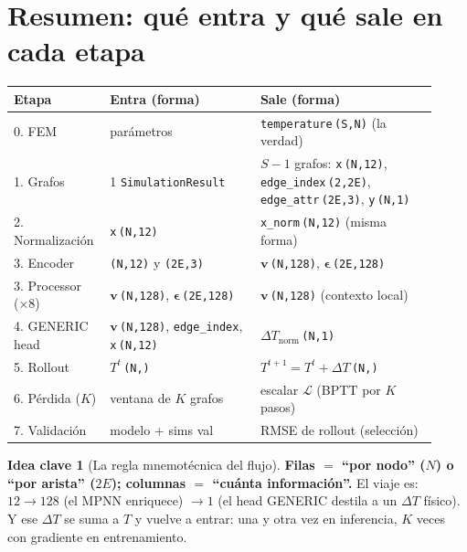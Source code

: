 \documentclass[11pt]{article}
\newcommand{\shp}[1]{{\color{shapecol}\texttt{(#1)}}}   %
\theoremstyle{definition}
\newtheorem{idea}{Idea clave}[section]
\begin{document}
\section{Resumen: qué entra y qué sale en cada etapa}
\label{sec:resumen}

\renewcommand{\arraystretch}{1.25}
\noindent\small
\begin{tabular}{@{}p{0.18\linewidth}p{0.34\linewidth}p{0.40\linewidth}@{}}
\toprule
Etapa & Entra (forma) & Sale (forma) \\
\midrule
0. FEM            & parámetros & \texttt{temperature}\,\shp{S,N} (la verdad) \\
1. Grafos         & 1 \texttt{SimulationResult} & $S{-}1$ grafos: \texttt{x}\,\shp{N,12}, \texttt{edge\_index}\,\shp{2,2E}, \texttt{edge\_attr}\,\shp{2E,3}, \texttt{y}\,\shp{N,1} \\
2. Normalización  & \texttt{x}\,\shp{N,12} & \texttt{x\_norm}\,\shp{N,12} (misma forma) \\
3. Encoder        & \shp{N,12} y \shp{2E,3} & $\bm v$\,\shp{N,128}, $\bm\epsilon$\,\shp{2E,128} \\
3. Processor (×8) & $\bm v$\,\shp{N,128}, $\bm\epsilon$\,\shp{2E,128} & $\bm v$\,\shp{N,128} (contexto local) \\
4. GENERIC head   & $\bm v$\,\shp{N,128}, \texttt{edge\_index}, \texttt{x}\,\shp{N,12} & $\Delta T_{\text{norm}}$\,\shp{N,1} \\
5. Rollout        & $T^{t}$\,\shp{N,} & $T^{t+1}=T^{t}+\Delta T$\,\shp{N,} \\
6. Pérdida ($K$)  & ventana de $K$ grafos & escalar $\mathcal L$ (BPTT por $K$ pasos) \\
7. Validación     & modelo + sims val & RMSE de rollout (selección) \\
\bottomrule
\end{tabular}

\bigskip
\begin{idea}[La regla mnemotécnica del flujo]
\textbf{Filas $=$ ``por nodo'' ($N$) o ``por arista'' ($2E$); columnas $=$ ``cuánta
información''.} El viaje es: $12 \to 128$ (el MPNN enriquece) $\to 1$ (el head
GENERIC destila a un $\Delta T$ físico). Y ese $\Delta T$ se suma a $T$ y vuelve a
entrar: una y otra vez en inferencia, $K$ veces con gradiente en entrenamiento.
\end{idea}
\end{document}
